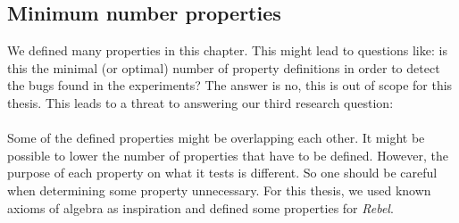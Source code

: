 \subsection*{Minimum number properties}
We defined many properties in this chapter. This might lead to questions like:
is this the minimal (or optimal) number of property definitions in order to
detect the bugs found in the experiments? The answer is no, this is out of scope
for this thesis. This leads to a threat to answering our third research
question:\rqThree\\
\\
Some of the defined properties might be overlapping each other. It might be possible to
lower the number of properties that have to be defined. However, the purpose of
each property on what it tests is different. So one should be careful when
determining some property unnecessary. For this thesis, we used known
axioms of algebra as inspiration and defined some properties for \textit{Rebel}.
